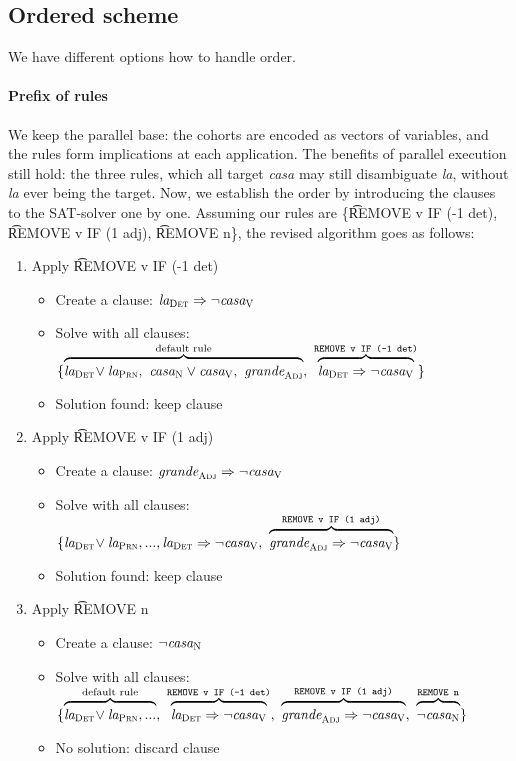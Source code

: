 \subsection{Ordered scheme}

We have different options how to handle order. 



\paragraph{Prefix of rules} We keep the parallel base: the cohorts are encoded as vectors of variables, and the rules form implications at each application.
The benefits of parallel execution still hold: the three rules, which all target \emph{casa} may still disambiguate \emph{la}, without \emph{la} ever being the target.
Now, we establish the order by introducing the clauses to the SAT-solver one by one. 
Assuming our rules are \{\t{REMOVE v IF (-1 det)}, \t{REMOVE v IF (1 adj)}, \t{REMOVE n}\}, the revised algorithm goes as follows:

\begin{enumerate}
\item Apply \t{REMOVE v IF (-1 det)}
 \begin{itemize}
    \item Create a clause: $\text{\em la}_{\text{\sc Det}} \Rightarrow \neg \text{\em casa}_{\text{\sc V}}$
    \item Solve with all clauses:
  $\{ \ob{\laDet \! \vee \laPrn, \ \casaN \vee \casaV, \  \grandeAdj}^{\text{default rule}}, \ 
      \ob{\laDet \Rightarrow \neg \casaV}^{\t{REMOVE v IF (-1 det)}} \}$
    \item Solution found: keep clause
 \end{itemize}
\item Apply \t{REMOVE v IF (1 adj)} 
 \begin{itemize}
    \item Create a clause: $\text{\em grande}_{\text{\sc Adj}} \Rightarrow \neg \text{\em casa}_{\text{\sc V}}$
    \item Solve with all clauses:
  $\{ \laDet \! \vee \laPrn, ..., \laDet \Rightarrow \neg \casaV, \ 
      \ob{\grandeAdj \Rightarrow \neg \casaV}^{\t{REMOVE v IF (1 adj)}}  \}$
    \item Solution found: keep clause
 \end{itemize}
\item Apply \t{REMOVE n}
 \begin{itemize}
    \item Create a clause: $\neg \text{\em casa}_{\text{\sc N}}$
    \item Solve with all clauses:
  $\{ \ob{\laDet \! \vee \laPrn, ...}^{\text{default rule}}, \ 
      \ob{\laDet \Rightarrow \neg \casaV}^{\t{REMOVE v IF (-1 det)}}, \ 
      \ob{\grandeAdj \Rightarrow \neg \casaV}^{\t{REMOVE v IF (1 adj)}}, \ 
      \ob{\neg \casaN}^{\t{REMOVE n}} \}$
    \item No solution: discard clause
 \end{itemize}
\end{enumerate}

